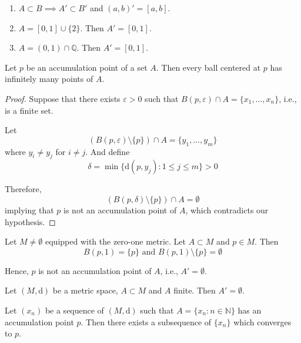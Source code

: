 \begin{example} \hfill
    \begin{enumerate}
        \item $A \subset B \implies A' \subset B'$ and $(a,b)' = [a,b]$.
        \item $A = [0,1] \cup \{ 2 \}$. Then $A' = [0,1]$.
        \item $A = (0,1) \cap \mathbb{Q}$. Then $A' = [0,1]$.
    \end{enumerate}
\end{example}

\begin{proposition}
    Let $p$ be an accumulation point of a set $A$. Then every ball centered at $p$ has infinitely many points of $A$.
\end{proposition}

\begin{proof}
    Suppose that there exists $\varepsilon > 0$ such that $B(p, \varepsilon) \cap A = \{ x_1, \ldots, x_n \}$, i.e., is a finite set.

    Let
    \[
        (B(p, \varepsilon) \setminus \{ p \}) \cap A = \{ y_1, \ldots, y_m \}
    \]
    where $y_i \neq y_j$ for $i \neq j$. And define 
    \[
        \delta = \min \{ \mathrm{d}(p, y_j) : 1 \leq j \leq m \} > 0
    \]

    Therefore,
    \[
        (B(p, \delta) \setminus \{ p \}) \cap A = \emptyset
    \]
    implying that $p$ is not an accumulation point of $A$, which contradicts our hypothesis.
\end{proof}

\begin{example}
    Let $M \neq \emptyset$ equipped with the zero-one metric. Let $A \subset M$ and $p \in M$. Then
    \[
        B(p, 1) = \{ p \} \text{ and } B(p, 1) \setminus \{ p \} = \emptyset
    \]

    Hence, $p$ is not an accumulation point of $A$, i.e., $A' = \emptyset$.
\end{example}

\begin{remark}
    Let $(M, \mathrm{d})$ be a metric space, $A \subset M$ and $A$ finite. Then $A' = \emptyset$.
\end{remark}

\begin{proposition}
    Let $(x_n)$ be a sequence of $(M, \mathrm{d})$ such that $A = \{ x_n : n \in \mathbb{N} \}$ has an accumulation point $p$. Then there exists a subsequence of $\{ x_n \}$ which converges to $p$.
\end{proposition}

